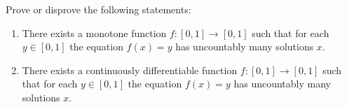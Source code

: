 \documentclass{article}
\begin{document}
\setlength{\parindent}{0pt}
Prove or disprove the following statements:
\begin{enumerate}[label=(\alph*)]
\item There exists a monotone function $f:[0,1]\to[0,1]$ such that for each $y\in[0,1]$ the equation $f(x)=y$ has uncountably many solutions $x$.
\item There exists a continuously differentiable function $f:[0,1]\to[0,1]$ such that for each $y\in[0,1]$ the equation $f(x)=y$ has uncountably many solutions $x$.
\end{enumerate}
\end{document}
